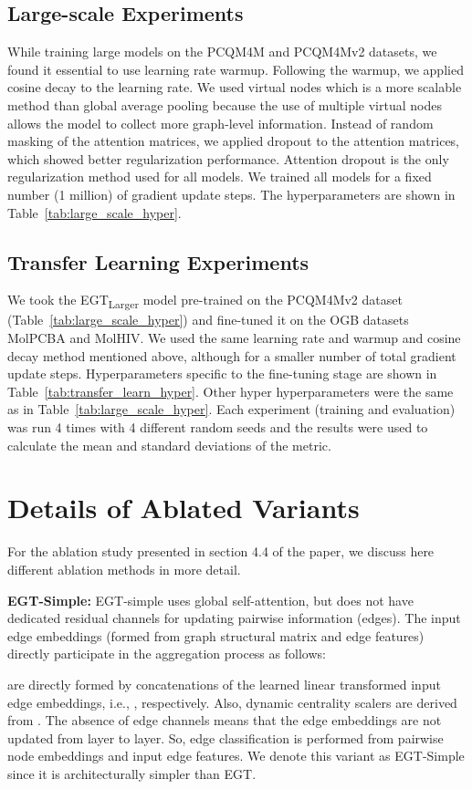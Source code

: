 \documentclass[sigconf,authorversion]{acmart}
\begin{document}
\subsection{Large-scale Experiments}
While training large models on the PCQM4M and PCQM4Mv2 datasets, we found it essential to use learning rate warmup. Following the warmup, we applied cosine decay to the learning rate. We used virtual nodes which is a more scalable method than global average pooling because the use of multiple virtual nodes allows the model to collect more graph-level information. Instead of random masking of the attention matrices, we applied dropout to the attention matrices, which showed better regularization performance. Attention dropout is the only regularization method used for all models. We trained all models for a fixed number (1 million) of gradient update steps. The hyperparameters are shown in Table~\ref{tab:large_scale_hyper}.

\subsection{Transfer Learning Experiments}
We took the EGT\textsubscript{Larger} model pre-trained on the PCQM4Mv2 dataset (Table~\ref{tab:large_scale_hyper}) and fine-tuned it on the OGB datasets MolPCBA and MolHIV. We used the same learning rate and warmup and cosine decay method mentioned above, although for a smaller number of total gradient update steps. Hyperparameters specific to the fine-tuning stage are shown in Table~\ref{tab:transfer_learn_hyper}. Other hyper hyperparameters were the same as in Table~\ref{tab:large_scale_hyper}. Each experiment (training and evaluation) was run 4 times with 4 different random seeds and the results were used to calculate the mean and standard deviations of the metric.

\section{Details of Ablated Variants}
For the ablation study presented in section 4.4 of the paper, we discuss here different ablation methods in more detail.

\noindent\textbf{EGT-Simple:}
EGT-simple uses global self-attention, but does not have dedicated residual channels for updating pairwise information (edges). The input edge embeddings (formed from graph structural matrix and edge features) directly participate in the aggregation process as follows:

 are directly formed by concatenations of the learned linear transformed input edge embeddings, i.e., ,  respectively. Also, dynamic centrality scalers are derived from . The absence of edge channels means that the edge embeddings  are not updated from layer to layer. So, edge classification is performed from pairwise node embeddings and input edge features. We denote this variant as EGT-Simple since it is architecturally simpler than EGT.
\end{document}
